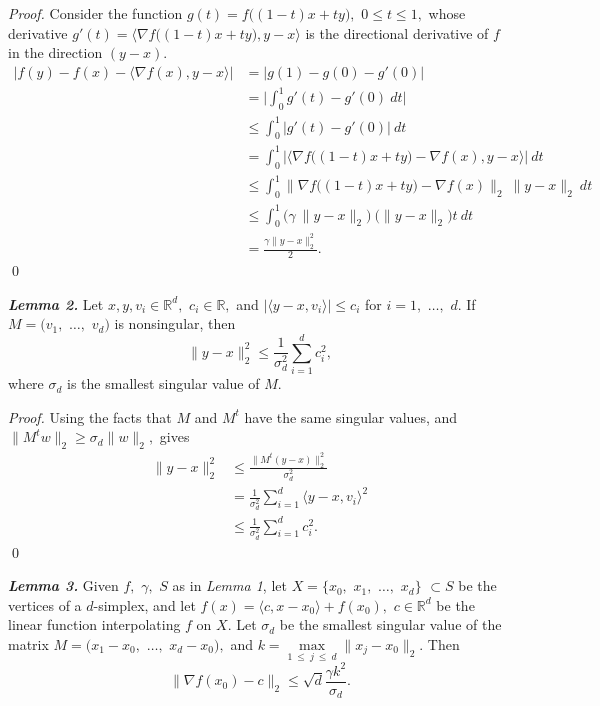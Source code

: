 \documentclass[smallextended]{svjour3}       %
\begin{document}
\noindent \textit{Proof.} Consider the function $g(t) = f \big((1-t) x + t y \big),$ $0 \leq t \leq 1,$ whose derivative $g'(t) = \big\langle \nabla f \big((1-t) x + t y \big), y - x \big\rangle$ is the directional derivative of $f$ in the direction $(y - x).$
%
\begin{align*}
  \big|f(y) - f(x) - \langle \nabla f(x), y - x \rangle \big|
     &= \big|g(1) - g(0) - g'(0) \big| & \\
     &= \bigg| \int_0^1 g'(t) - g'(0)\ dt \bigg| \\
     &\leq \int_0^1 \big|g'(t) - g'(0)\big|\ dt \\
     &= \int_0^1 \bigg| \big \langle \nabla f\big((1-t)x + ty\big) - \nabla f(x), y - x \big \rangle \bigg|\ dt \\
     &\leq \int_0^1 \big \| \nabla f\big((1-t)x + ty\big) - \nabla f(x) \big \|_2\ \| y - x \|_2\ dt \\
     &\leq \int_0^1 \big ( \gamma\ \|y-x\|_2 \big) \ \big( \|y-x\|_2 \big) t\ dt \\
     &= \frac{\gamma \|y - x\|_2^2}{2}.
\end{align*}
%
\qed

\noindent \textbf{\textit{Lemma 2.}} Let $x, y, v_i \in \mathbb{R}^d,$ $c_i \in \mathbb{R},$ and $|\langle y - x, v_i \rangle| \leq c_i$ for $i = 1,$ $\ldots,$ $d.$ If $M = (v_1,$ $\ldots,$ $v_d)$ is nonsingular, then
%
$$\|y - x\|_2^2 \leq \frac{1}{\sigma_d^2} \sum_{i=1}^d c_i^2,$$
%
where $\sigma_d$ is the smallest singular value of $M.$

\noindent \textit{Proof.} Using the facts that $M$ and $M^t$ have the same singular values, and $\|M^tw\|_2 \geq \sigma_d \|w\|_2,$ gives
%
\begin{align*}
     \|y - x\|_2^2 &\leq \frac{\|M^t (y - x)\|_2^2}{\sigma_d^2} \\
                   &=    \frac{1}{\sigma_d^2} \sum_{i=1}^d \langle y - x, v_i \rangle^2 \\
                   &\leq \frac{1}{\sigma_d^2} \sum_{i=1}^d c_i^2.
\end{align*}
%
\qed

\noindent \textbf{\textit{Lemma 3.}} Given $f,$ $\gamma,$ $S$ as in {\it Lemma 1}, let $X = \{x_0,$ $x_1,$ $\ldots,$ $x_d\}$ $\subset S$ be the vertices of a $d$-simplex, and let $\hat f(x) = \langle c, x - x_0 \rangle + f(x_0),$ $c \in \mathbb{R}^d$ be the linear function interpolating $f$ on $X.$ Let $\sigma_d$ be the smallest singular value of the matrix $M = (x_1 - x_0,$ $\ldots,$ $x_d - x_0),$ and $k = \max\limits_{1\ \leq\ j\ \leq\ d} \|x_j - x_0\|_2.$ Then
%
$$\big\|\nabla f(x_0) - c\big\|_2 \leq \sqrt{d} \frac{\gamma k^2}{\sigma_d}.$$
\end{document}

